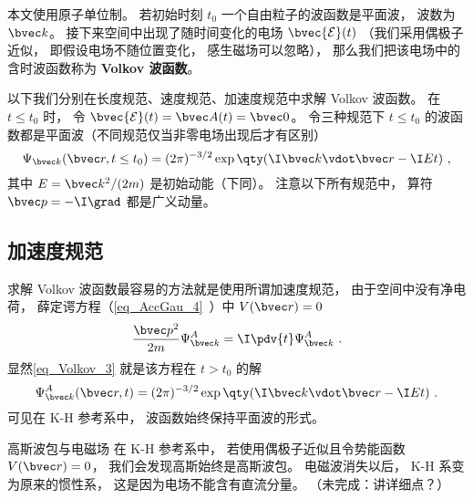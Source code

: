 
\begin{issues}
\issueTODO
\end{issues}


本文使用原子单位制。 若初始时刻 $t_0$ 一个自由粒子的波函数是平面波， 波数为 $\bvec k$。 接下来空间中出现了随时间变化的电场 $\bvec {\mathcal E}(t)$ （我们采用偶极子近似， 即假设电场不随位置变化， 感生磁场可以忽略）， 那么我们把该电场中的含时波函数称为 \textbf{Volkov 波函数}。

以下我们分别在长度规范、速度规范、加速度规范中求解 Volkov 波函数。 在 $t \le t_0$ 时， 令 $\bvec {\mathcal E}(t) = \bvec A(t) = \bvec 0$。 令三种规范下 $t \le t_0$ 的波函数都是平面波（不同规范仅当非零电场出现后才有区别）
\begin{equation}\label{eq_Volkov_3}
\Psi_{\bvec k}(\bvec r, t \le t_0) = (2\pi)^{-3/2} \exp\qty(\I\bvec k \vdot \bvec r - \I E t)~,
\end{equation}
其中 $E = \bvec k^2/(2m)$ 是初始动能（下同）。 注意以下所有规范中， 算符 $\bvec p = -\I \grad$ 都是广义动量。

\subsection{加速度规范}
求解 Volkov 波函数最容易的方法就是使用所谓加速度规范， 由于空间中没有净电荷， 薛定谔方程（\autoref{eq_AccGau_4}~）中 $V(\bvec r) = 0$
\begin{equation}
\frac{\bvec p^2}{2m}\Psi_{\bvec k}^A = \I \pdv{t} \Psi_{\bvec k}^A~.
\end{equation}
显然\autoref{eq_Volkov_3} 就是该方程在 $t > t_0$ 的解
\begin{equation}\label{eq_Volkov_2}
\Psi_{\bvec k}^A(\bvec r, t) = (2\pi)^{-3/2} \exp\qty(\I\bvec k \vdot \bvec r - \I E t)~.
\end{equation}
可见在 K-H 参考系中， 波函数始终保持平面波的形式。

\begin{example}{高斯波包与电磁场}
在 K-H 参考系中， 若使用偶极子近似且令势能函数 $V(\bvec r) = 0$， 我们会发现高斯始终是高斯波包。 电磁波消失以后， K-H 系变为原来的惯性系， 这是因为电场不能含有直流分量。 （未完成：讲详细点？）
\end{example}

